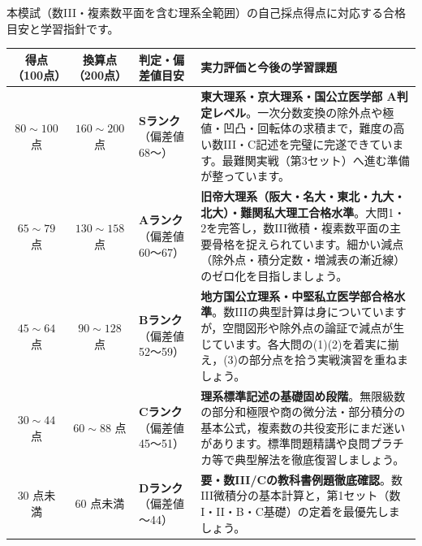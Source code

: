 \par\vspace{1.0mm}\noindent
{\footnotesize 本模試（数III・複素数平面を含む理系全範囲）の自己採点得点に対応する合格目安と学習指針です。}
\par\vspace{1.5mm}
\begin{center}\footnotesize
\renewcommand{\arraystretch}{1.28}
\begin{tabular}{@{}cclp{26em}@{}}
\toprule
\textbf{得点（100点）} & \textbf{換算点（200点）} & \textbf{判定・偏差値目安} & \textbf{実力評価と今後の学習課題} \\
\midrule
$80 \sim 100$ 点 & $160 \sim 200$ 点 & \textbf{Sランク}（偏差値 68〜） & \textbf{東大理系・京大理系・国公立医学部 A判定レベル}。一次分数変換の除外点や極値・凹凸・回転体の求積まで，難度の高い数III・C記述を完璧に完遂できています。最難関実戦（第3セット）へ進む準備が整っています。 \\
$65 \sim 79$ 点 & $130 \sim 158$ 点 & \textbf{Aランク}（偏差値 60〜67） & \textbf{旧帝大理系（阪大・名大・東北・九大・北大）・難関私大理工合格水準}。大問1・2を完答し，数III微積・複素数平面の主要骨格を捉えられています。細かい減点（除外点・積分定数・増減表の漸近線）のゼロ化を目指しましょう。 \\
$45 \sim 64$ 点 & $90 \sim 128$ 点 & \textbf{Bランク}（偏差値 52〜59） & \textbf{地方国公立理系・中堅私立医学部合格水準}。数IIIの典型計算は身についていますが，空間図形や除外点の論証で減点が生じています。各大問の(1)(2)を着実に揃え，(3)の部分点を拾う実戦演習を重ねましょう。 \\
$30 \sim 44$ 点 & $60 \sim 88$ 点 & \textbf{Cランク}（偏差値 45〜51） & \textbf{理系標準記述の基礎固め段階}。無限級数の部分和極限や商の微分法・部分積分の基本公式，複素数の共役変形にまだ迷いがあります。標準問題精講や良問プラチカ等で典型解法を徹底復習しましょう。 \\
$30$ 点未満 & $60$ 点未満 & \textbf{Dランク}（偏差値 〜44） & \textbf{要・数III/Cの教科書例題徹底確認}。数III微積分の基本計算と，第1セット（数I・II・B・C基礎）の定着を最優先しましょう。 \\
\bottomrule
\end{tabular}
\end{center}


